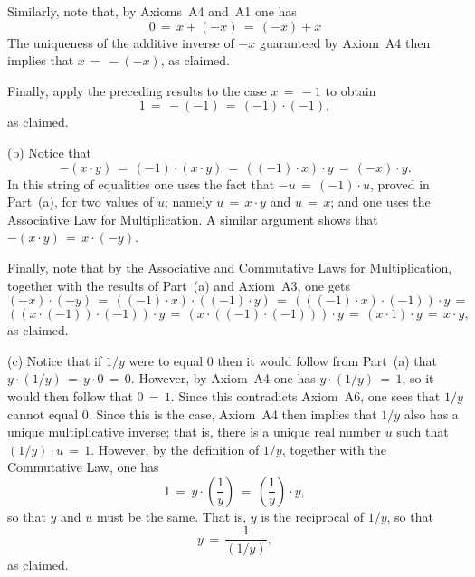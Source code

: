         Similarly, note that, by Axioms~A4 and~A1 one has
        \begin{displaymath}
        0 \,=\, x+(-x) \,=\, (-x) + x
        \end{displaymath}
    The uniqueness of the additive inverse of $-x$ guaranteed by Axiom~A4 then implies that $x \,=\, -(-x)$, as claimed.

        Finally, apply the preceding results to the case $x \,=\, -1$ to obtain
        \begin{displaymath}
        1 \,=\, -(-1) \,=\, (-1){\cdot}(-1),
        \end{displaymath}
    as claimed.

\V

        (b) Notice that
        \begin{displaymath}
        -(x{\cdot}y) \,=\, (-1){\cdot}(x{\cdot}y) \,=\, ((-1){\cdot}x){\cdot}y \,=\, (-x){\cdot}y.
        \end{displaymath}
    In this string of equalities one uses the fact that $-u \,=\, (-1){\cdot}u$, proved in Part~(a), for two values of $u$; namely $u \,=\, x{\cdot}y$ and $u \,=\, x$; and one uses the Associative Law for Multiplication.
    A similar argument shows that $-(x{\cdot}y) \,=\, x{\cdot}(-y)$.

        Finally, note that by the Associative and Commutative Laws for Multiplication, together with the results of Part~(a) and Axiom~A3, one gets
        \begin{displaymath}
        (-x){\cdot}(-y) \,=\, ((-1){\cdot}x){\cdot}((-1){\cdot}y) \,=\, 
    (((-1){\cdot}x){\cdot}(-1)){\cdot}y \,=\,
        \end{displaymath}
        \begin{displaymath}
    ((x{\cdot}(-1)){\cdot}(-1)){\cdot}y
     \,=\, (x{\cdot}((-1){\cdot}(-1))){\cdot}y \,=\, 
    (x{\cdot}1){\cdot}y \,=\, x{\cdot}y,
        \end{displaymath}
    as claimed.

\V

        (c) Notice that if $1/y$ were to equal $0$ then it would follow from Part~(a) that $y{\cdot}(1/y) \,=\, y{\cdot}0 \,=\, 0$.
    However, by Axiom~A4 one has $y{\cdot}(1/y) \,=\, 1$, so it would then follow that $0 \,=\, 1$.
    Since this contradicts Axiom~A6, one sees that $1/y$ cannot equal $0$.
    Since this is the case, Axiom~A4 then implies that $1/y$ also has a unique multiplicative inverse;
    that is, there is a unique real number $u$ such that $(1/y){\cdot}u \,=\, 1$.
    However, by the definition of $1/y$, together with the Commutative Law, one has
        \begin{displaymath}
        1 \,=\, y{\cdot}\left(\frac{1}{y}\right) \,=\, \left(\frac{1}{y}\right){\cdot}y,
        \end{displaymath}
    so that $y$ and $u$ must be the same. That is, $y$ is the reciprocal of $1/y$, so that
        \begin{displaymath}
        y \,=\, \frac{1}{(1/y)},
        \end{displaymath}
    as claimed.

